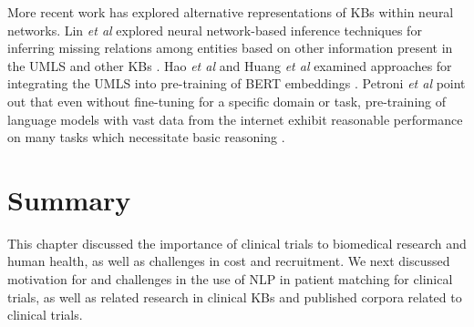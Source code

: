 \documentclass[../main.tex]{subfiles}
\begin{document}
More recent work has explored alternative representations of KBs within neural networks. Lin \textit{et al} explored neural network-based inference techniques for inferring missing relations among entities based on other information present in the UMLS and other KBs \cite{lin2018multi}. Hao \textit{et al} and Huang \textit{et al} examined approaches for integrating the UMLS into pre-training of BERT \cite{devlin2018bert} embeddings \cite{hao2020enhancing, huang2020biomedical}. Petroni \textit{et al} point out that even without fine-tuning for a specific domain or task, pre-training of language models with vast data from the internet exhibit reasonable performance on many tasks which necessitate basic reasoning \cite{petroni2019language}.

\section{Summary}

This chapter discussed the importance of clinical trials to biomedical research and human health, as well as challenges in cost and recruitment. We next discussed motivation for and challenges in the use of NLP in patient matching for clinical trials, as well as related research in clinical KBs and published corpora related to clinical trials.
\end{document}
